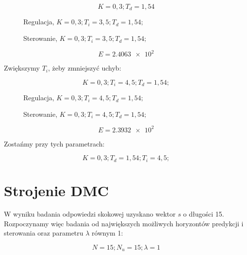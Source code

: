 \begin{equation}
    K = 0,3; T_d = 1,54
\end{equation}

\begin{figure}[H]
\centering

\caption{Regulacja, $K = 0,3; T_i=3,5; T_d=1,54;$}
\end{figure}

\begin{figure}[H]
\centering

\caption{Sterowanie, $K = 0,3; T_i=3,5; T_d=1,54;$}
\end{figure}

\begin{equation}
    E = \num{2,4063e2}
\end{equation}

Zwiększymy $T_i$, żeby zmniejszyć uchyb:

\begin{equation}
    K = 0,3; T_i = 4,5; T_d = 1,54;
\end{equation}

\begin{figure}[H]
\centering

\caption{Regulacja, $K = 0,3; T_i=4,5; T_d=1,54;$}
\end{figure}

\begin{figure}[H]
\centering

\caption{Sterowanie, $K = 0,3; T_i=4,5; T_d=1,54;$}
\end{figure}

\begin{equation}
    E = \num{2,3932e2}
\end{equation}

Zostańmy przy tych parametrach:

\begin{equation}
    K = 0,3; T_d = 1,54; T_i = 4,5;
\end{equation}

\section{Strojenie DMC}

W wyniku badania odpowiedzi skokowej uzyskano wektor $s$ o długości 15. Rozpoczynamy więc badania od największych możliwych horyzontów predykcji i sterowania oraz parametru $\lambda$ równym 1:

\begin{equation}
    N = 15; N_u = 15; \lambda = 1
\end{equation}

